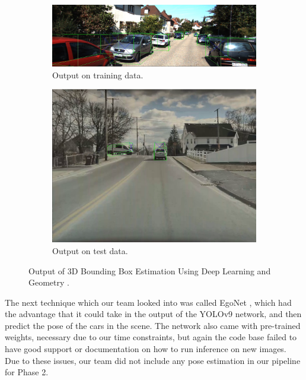 \begin{figure}
    \centering
    \begin{subfigure}{0.95\linewidth}
        \centering
        \includegraphics[width=\textwidth]{images/car_pose_train.png}
        \caption{Output on training data.}
        \label{fig:3DBoxEstimation_output_trained}
    \end{subfigure}
    \begin{subfigure}{0.95\linewidth}
        \centering
        \includegraphics[width=\textwidth]{images/car_pose.png}
        \caption{Output on test data.}
        \label{fig:3DBoxEstimation_output_test}
    \end{subfigure}
    \caption{Output of 3D Bounding Box Estimation Using Deep Learning and Geometry \cite{3DBoxEstimation}.}
\end{figure}

The next technique which our team looked into was called EgoNet \cite{EgoNet}, which had the advantage that it could take in the output of the YOLOv9 network, and then predict the pose of the cars in the scene. The network also came with pre-trained weights, necessary due to our time constraints, but again the code base failed to have good support or documentation on how to run inference on new images. Due to these issues, our team did not include any pose estimation in our pipeline for Phase 2.
